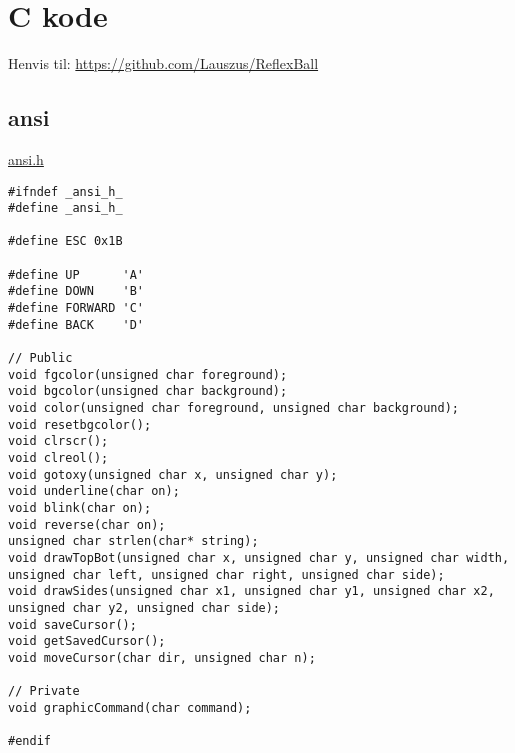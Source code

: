 \chapter{C kode}
Henvis til: \url{https://github.com/Lauszus/ReflexBall}

\section{ansi}
\label{ansi}

\underline{ansi.h}
\begin{lstlisting}
#ifndef _ansi_h_
#define _ansi_h_

#define ESC 0x1B

#define UP		'A'
#define DOWN	'B'
#define FORWARD	'C'
#define BACK	'D'

// Public
void fgcolor(unsigned char foreground);
void bgcolor(unsigned char background);
void color(unsigned char foreground, unsigned char background);
void resetbgcolor();
void clrscr();
void clreol();
void gotoxy(unsigned char x, unsigned char y);
void underline(char on);
void blink(char on);
void reverse(char on);
unsigned char strlen(char* string);
void drawTopBot(unsigned char x, unsigned char y, unsigned char width, unsigned char left, unsigned char right, unsigned char side);
void drawSides(unsigned char x1, unsigned char y1, unsigned char x2, unsigned char y2, unsigned char side);
void saveCursor();
void getSavedCursor();
void moveCursor(char dir, unsigned char n);

// Private
void graphicCommand(char command);

#endif
\end{lstlisting}

